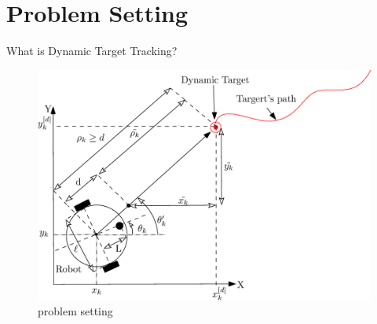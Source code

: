 \documentclass{beamer}
\begin{document}
\section{Problem Setting}
\begin{frame}{What is Dynamic Target Tracking?}
\begin{center}
\begin{figure}
\includegraphics[scale=0.3]{figs/ipe/LFMICSetup.eps}
\caption{problem setting}
\end{figure}
\end{center}
\end{frame}
\end{document}
